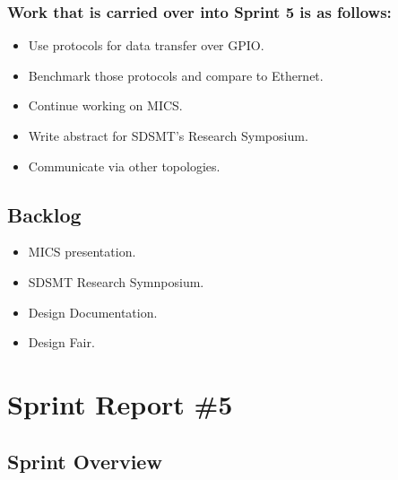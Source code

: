 \subsubsection*{Work that is carried over into Sprint 5 is as follows:}
\begin{itemize}
	\item Use protocols for data transfer over GPIO.
	\item Benchmark those protocols and compare to Ethernet.
	\item Continue working on MICS.
	\item Write abstract for SDSMT's Research Symposium.
	\item Communicate via other topologies.
\end{itemize}

\subsection*{Backlog}
\begin{itemize}
	\item MICS presentation.
	\item SDSMT Research Symnposium. 
	\item Design Documentation.
	\item Design Fair.
\end{itemize}

\section{Sprint Report \#5}

\subsection*{Sprint Overview}
